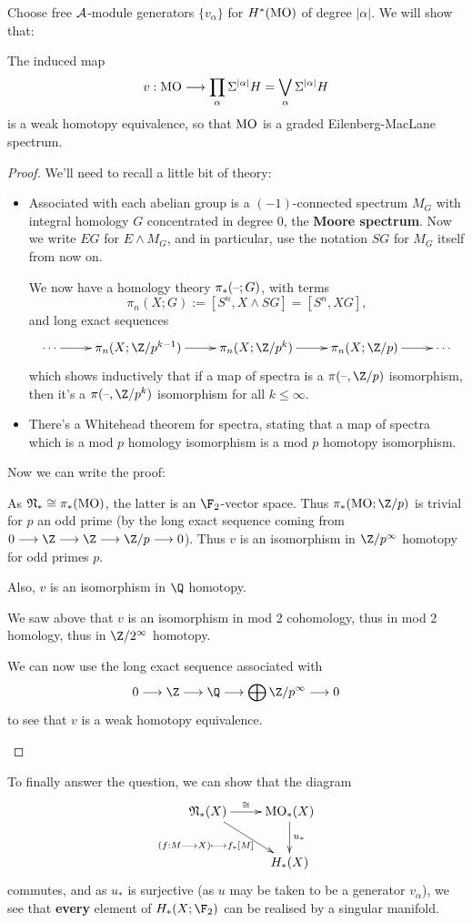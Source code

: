 \documentclass[11pt]{article}
\renewcommand{\Steen}{\calA}
\begin{document}
Choose free $\Steen$-module generators $\{v_\alpha\}$ for $H^*(\operatorname{{MO}})$ of degree $|\alpha|$. We will show that:
\begin{thm*}
The induced map
\[v:\operatorname{{MO}}\longrightarrow \prod_{\alpha}\Sigma^{|\alpha|}H=\bigvee_{\alpha}\Sigma^{|\alpha|}H\]
is a weak homotopy equivalence, so that $\operatorname{{MO}}$ is a graded Eilenberg-MacLane spectrum.
\end{thm*}
\begin{proof}
We'll need to recall a little bit of theory:
\begin{itemize}\squishlist
\item Associated with each abelian group is a $(-1)$-connected spectrum $M_G$ with integral homology $G$ concentrated in degree 0, the \textbf{Moore spectrum}. Now we write $EG$ for $E\wedge M_G$, and in particular, use the notation $SG$ for $M_G$ itself from now on.

We now have a homology theory $\pi_{*}(\textup{--} ;G)$, with terms
\[\pi_{n}(X;G):=[S^n,X\wedge SG]=[S^n,XG],\]
and long exact sequences
\[\xymatrix{\cdots\ar[r]&
\pi_n(X;\Z/p^{k-1})\ar[r]&
\pi_n(X;\Z/p^{k})\ar[r]&
\pi_n(X;\Z/p)\ar[r]&
\cdots}\]
which shows inductively that if a map of spectra is a $\pi(\DASH ,\Z/p)$ isomorphism, then it's a $\pi(\DASH ,\Z/p^k)$ isomorphism for all $k\leq\infty$.
\item There's a Whitehead theorem for spectra, stating that a map of spectra which is a mod $p$ homology isomorphism is a mod $p$ homotopy isomorphism.
\end{itemize}
Now we can write the proof:
\begin{itemise}
\item As $\mathfrak{N}_*\cong\pi_{*}(\operatorname{{MO}})$, the latter is an $\F_2$-vector space. Thus $\pi_{*}(\MO;\Z/p)$ is trivial for $p$ an odd prime (by the long exact sequence coming from $0\to \Z\to \Z\to \Z/p\to 0$). Thus $v$ is an isomorphism in $\Z/p^\infty$ homotopy for odd primes $p$.
\item Also, $v$ is an isomorphism in $\Q$ homotopy.
\item We saw above that $v$ is an isomorphism in mod 2 cohomology, thus in mod 2 homology, thus in $\Z/2^\infty$ homotopy.
\item We can now use the long exact sequence associated with
\[0\to\Z\to \Q\to \bigoplus\Z/p^\infty\to0\]
to see that $v$ is a weak homotopy equivalence.\qedhere
\end{itemise}

\end{proof}
To finally answer the question, we can show that the diagram
\[\xymatrix{
\frakN_*(X)
\ar[r]^-{\cong }
\ar[dr]_-{(f:M\to X)\mapsto f_*[M]\ \ \ }
&%
\MO_*(X)
\ar[d]^-{u_*}
\\%
&%
H_*(X)%
}\]
commutes, and as $u_*$ is surjective (as $u$ may be taken to be a generator $v_\alpha$), we see that \textbf{every} element of $H_*(X;\F_2)$ can be realised by a singular manifold.
\end{document}

